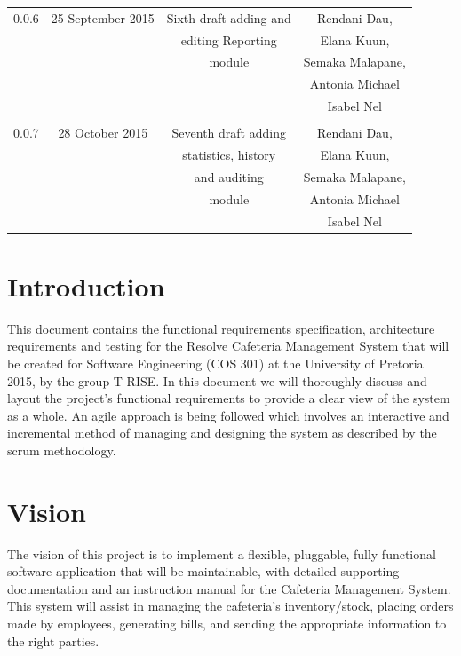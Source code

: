 \documentclass[a4paper,12pt]{report}
\begin{document}
\begin{table}[h!]
\begin{tabular}{||c c c c||}
 0.0.6 & 25 September 2015 &  Sixth draft adding and & Rendani Dau, \\ & & editing Reporting  & Elana Kuun, \\ & & module  & Semaka Malapane, \\ & & &  Antonia Michael \\ & & & Isabel Nel \\   [1ex] 
\hline
& & & \\
 0.0.7 & 28 October 2015 &  Seventh draft adding & Rendani Dau, \\ & & statistics, history & Elana Kuun, \\ & & and auditing & Semaka Malapane, \\ & & module &  Antonia Michael \\ & & & Isabel Nel \\   [1ex] 
\hline
 \end{tabular}
\end{table}

\pagebreak




\section{Introduction}
This document contains the functional requirements specification, architecture requirements and testing for the Resolve Cafeteria Management System that will be created for Software Engineering (COS 301) at the University of Pretoria 2015, by the group T-RISE. In this document we will thoroughly discuss and layout the project's functional requirements to provide a clear view of the system as a whole. An agile approach is being followed which involves an interactive and incremental method of managing and designing the system as described by the scrum methodology.
\section{Vision}
The vision of this project is to implement a flexible, pluggable, fully functional software application that will be maintainable, with detailed supporting documentation and an instruction manual for the Cafeteria Management System. This system will assist in managing the cafeteria's inventory/stock, placing orders made by employees, generating bills, and sending the appropriate information to the right parties.  
\end{document}
